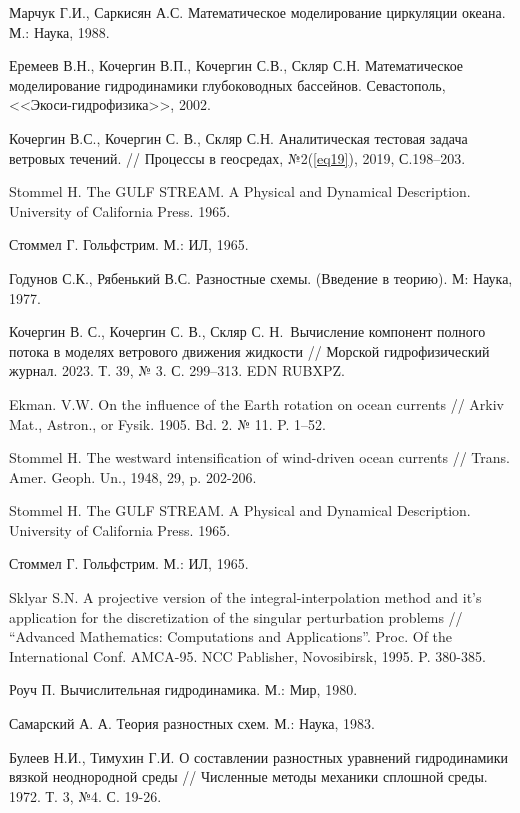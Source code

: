 \documentclass[press]{vestnik}
\begin{document}
\begin{thebibliography}{12}
Марчук Г.И., Саркисян А.С. Математическое моделирование циркуляции океана. М.: Наука, 1988.

Еремеев В.Н., Кочергин В.П., Кочергин С.В., Скляр С.Н. Математическое моделирование гидродинамики глубоководных бассейнов. Севастополь, <<Экоси-гидрофизика>>, 2002.

Кочергин В.С., Кочергин С. В., Скляр С.Н. Аналитическая тестовая задача ветровых течений. // Процессы в геосредах, №2(\ref{eq19}), 2019, С.198--203.

Stommel H. The GULF STREAM. A Physical and Dynamical Description. University of California Press. 1965.

Стоммел Г. Гольфстрим. М.: ИЛ, 1965.

Годунов С.К., Рябенький В.С. Разностные схемы. (Введение в теорию). М: Наука, 1977.

Кочергин В. С., Кочергин С. В., Скляр С. Н.~Вычисление компонент полного потока в моделях ветрового движения жидкости // Морской гидрофизический журнал. 2023. Т. 39, № 3. С. 299--313. EDN RUBXPZ. 
	
Ekman. V.W. On the influence of the Earth rotation on ocean currents // Arkiv Mat., Astron., or Fysik. 1905. Bd. 2. № 11. P. 1--52.

Stommel H. The westward intensification of wind-driven ocean currents // Trans. Amer. Geoph. Un., 1948, 29, p. 202-206.

Stommel H. The GULF STREAM. A Physical and Dynamical Description. University of California Press. 1965.

Стоммел Г. Гольфстрим. М.: ИЛ, 1965.

Sklyar S.N. A projective version of the integral-interpolation method and it's application for the discretization of the singular perturbation problems // ``Advanced Mathematics: Computations and Applications''. Proc. Of the International Conf. AMCA-95. NCC Pablisher, Novosibirsk, 1995. P. 380-385.

Роуч П. Вычислительная гидродинамика. М.: Мир, 1980.

Самарский А. А. Теория разностных схем. М.: Наука, 1983.

Булеев Н.И., Тимухин Г.И. О составлении разностных уравнений гидродинамики вязкой неоднородной среды // Численные методы механики сплошной среды. 1972. Т. 3, №4. С. 19-26. 


\end{thebibliography}
\end{document}
